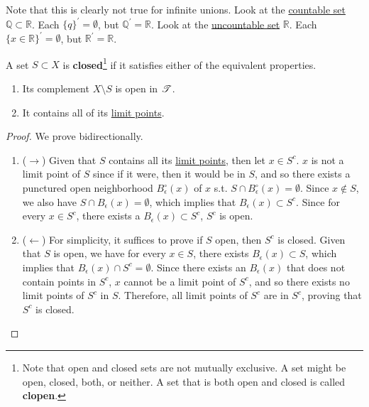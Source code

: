   Note that this is clearly not true for infinite unions. Look at the \hyperref[st-def:countable]{countable set} $\mathbb{Q} \subset \mathbb{R}$. Each $\{q\}^\prime = \emptyset$, but $\mathbb{Q}^\prime = \mathbb{R}$. Look at the \hyperref[st-def:uncountable-set]{uncountable set} $\mathbb{R}$. Each $\{x \in \mathbb{R}\}^\prime = \emptyset$, but $\mathbb{R}^\prime = \mathbb{R}$. 

  \begin{definition} 
		\label{def:closed}
    A set $S \subset X$ is \textbf{closed}\footnote{Note that open and closed sets are not mutually exclusive. A set might be open, closed, both, or neither. A set that is both open and closed is called \textbf{clopen}.} if it satisfies either of the equivalent properties. 
    \begin{enumerate}
      \item Its complement $X \setminus S$ is open in $\operatorname{\mathscr{T}}$. 
      \item It contains all of its \hyperref[def:limit-point]{limit points}. 
    \end{enumerate}
  \end{definition}
  \begin{proof}
    We prove bidirectionally. 
    \begin{enumerate}
      \item ($\rightarrow$) Given that $S$ contains all its \hyperref[def:limit-point]{limit points}, then let $x \in S^c$. $x$ is not a limit point of $S$ since if it were, then it would be in $S$, and so there exists a punctured open neighborhood $B_\epsilon^\circ (x)$ of $x$ s.t. $S \cap B_\epsilon^\circ (x) = \emptyset$. Since $x \not\in S$, we also have $S \cap B_\epsilon (x) = \emptyset$, which implies that $B_\epsilon (x) \subset S^c$. Since for every $x \in S^c$, there exists a $B_\epsilon (x) \subset S^c$, $S^c$ is open. 

      \item ($\leftarrow$) For simplicity, it suffices to prove if $S$ open, then $S^c$ is closed. Given that $S$ is open, we have for every $x \in S$, there exists $B_\epsilon (x) \subset S$, which implies that $B_\epsilon (x) \cap S^c = \emptyset$. Since there exists an $B_\epsilon (x)$ that does not contain points in $S^c$, $x$ cannot be a limit point of $S^c$, and so there exists no limit points of $S^c$ in $S$. Therefore, all limit points of $S^c$ are in $S^c$, proving that $S^c$ is closed.  
    \end{enumerate}
  \end{proof}
  
